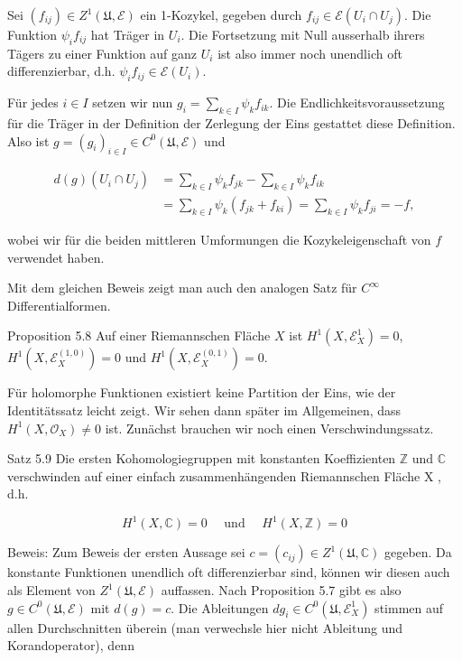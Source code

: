 \documentclass[10pt, letterpaper]{article}
\begin{document}
Sei $\left(f_{i j}\right) \in Z^{1}(\mathfrak{U}, \mathcal{E})$ ein 1-Kozykel, gegeben durch $f_{i j} \in \mathcal{E}\left(U_{i} \cap U_{j}\right)$. Die Funktion $\psi_{i} f_{i j}$ hat Träger in $U_{i}$. Die Fortsetzung mit Null ausserhalb ihrers Tägers zu einer Funktion auf ganz $U_{i}$ ist also immer noch unendlich oft differenzierbar, d.h. $\psi_{i} f_{i j} \in \mathcal{E}\left(U_{i}\right)$.

Für jedes $i \in I$ setzen wir nun $g_{i}=\sum_{k \in I} \psi_{k} f_{i k}$. Die Endlichkeitsvoraussetzung für die Träger in der Definition der Zerlegung der Eins gestattet diese Definition. Also ist $g=\left(g_{i}\right)_{i \in I} \in C^{0}(\mathfrak{U}, \mathcal{E})$ und

$$
\begin{aligned}
d(g)\left(U_{i} \cap U_{j}\right) & =\sum_{k \in I} \psi_{k} f_{j k}-\sum_{k \in I} \psi_{k} f_{i k} \\
& =\sum_{k \in I} \psi_{k}\left(f_{j k}+f_{k i}\right)=\sum_{k \in I} \psi_{k} f_{j i}=-f,
\end{aligned}
$$

wobei wir für die beiden mittleren Umformungen die Kozykeleigenschaft von $f$ verwendet haben.

Mit dem gleichen Beweis zeigt man auch den analogen Satz für $C^{\infty}$ Differentialformen.

Proposition 5.8 Auf einer Riemannschen Fläche $X$ ist $H^{1}\left(X, \mathcal{E}_{X}^{1}\right)=0$, $H^{1}\left(X, \mathcal{E}_{X}^{(1,0)}\right)=0$ und $H^{1}\left(X, \mathcal{E}_{X}^{(0,1)}\right)=0$.

Für holomorphe Funktionen existiert keine Partition der Eins, wie der Identitätssatz leicht zeigt. Wir sehen dann später im Allgemeinen, dass $H^{1}\left(X, \mathcal{O}_{X}\right) \neq 0$ ist. Zunächst brauchen wir noch einen Verschwindungssatz.

Satz 5.9 Die ersten Kohomologiegruppen mit konstanten Koeffizienten $\mathbb{Z}$ und $\mathbb{C}$ verschwinden auf einer einfach zusammenhängenden Riemannschen Fläche X , d.h.

$$
H^{1}(X, \mathbb{C})=0 \quad \text { und } \quad H^{1}(X, \mathbb{Z})=0
$$

Beweis: Zum Beweis der ersten Aussage sei $c=\left(c_{i j}\right) \in Z^{1}(\mathfrak{U}, \mathbb{C})$ gegeben. Da konstante Funktionen unendlich oft differenzierbar sind, können wir diesen auch als Element von $Z^{1}(\mathfrak{U}, \mathcal{E})$ auffassen. Nach Proposition 5.7 gibt es also $g \in C^{0}(\mathfrak{U}, \mathcal{E})$ mit $d(g)=c$. Die Ableitungen $d g_{i} \in C^{0}\left(\mathfrak{U}, \mathcal{E}_{X}^{1}\right)$ stimmen auf allen Durchschnitten überein (man verwechsle hier nicht Ableitung und Korandoperator), denn
\end{document}
